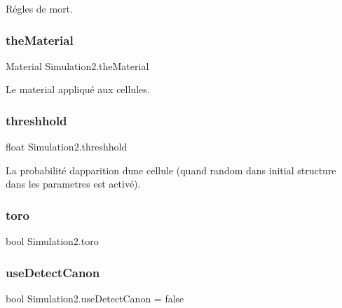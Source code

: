 Régles de mort. 

\mbox{\label{class_simulation2_a2ec94d393d26bf7926018f93ef544ef0}} 
\subsubsection{\texorpdfstring{the\+Material}{theMaterial}}
{\footnotesize\ttfamily Material Simulation2.\+the\+Material}



Le material appliqué aux cellules. 

\mbox{\label{class_simulation2_a17803d7383b2bbd62c96572cd3370d06}} 
\subsubsection{\texorpdfstring{threshhold}{threshhold}}
{\footnotesize\ttfamily float Simulation2.\+threshhold}



La probabilité d\textquotesingle{}apparition d\textquotesingle{}une cellule (quand random dans initial structure dans les parametres est activé). 

\mbox{\label{class_simulation2_abefcdee48ca39bb47d28984bcf033ca4}} 
\subsubsection{\texorpdfstring{toro}{toro}}
{\footnotesize\ttfamily bool Simulation2.\+toro}

\mbox{\label{class_simulation2_ae390b35abb2471abc8e257633896404a}} 
\subsubsection{\texorpdfstring{use\+Detect\+Canon}{useDetectCanon}}
{\footnotesize\ttfamily bool Simulation2.\+use\+Detect\+Canon = false}

